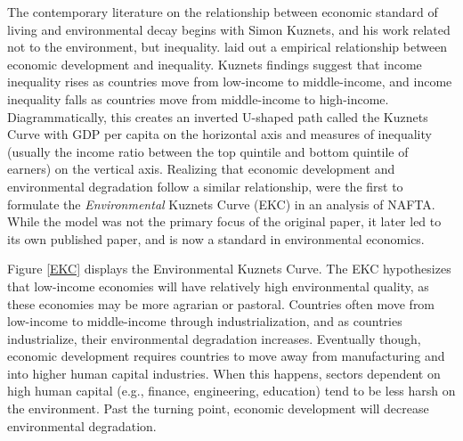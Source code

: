 The contemporary literature on the relationship between economic standard of living and environmental decay begins with Simon Kuznets, and his work related not to the environment, but inequality. \cite{kuznets1955economic} laid out a empirical relationship between economic development and inequality. Kuznets findings suggest that income inequality rises as countries move from low-income to middle-income, and income inequality falls as countries move from middle-income to high-income. Diagrammatically, this creates an inverted U-shaped path called the Kuznets Curve with GDP per capita on the horizontal axis and measures of inequality (usually the income ratio between the top quintile and bottom quintile of earners) on the vertical axis. Realizing that economic development and environmental degradation follow a similar relationship, \cite{NBERw3914} were the first to formulate the \emph{Environmental} Kuznets Curve (EKC) in an analysis of NAFTA. While the model was not the primary focus of the original paper, it later led to its own published paper, \cite{grossman1995economic} and is now a standard in environmental economics. 

Figure \ref{EKC} displays the Environmental Kuznets Curve. The EKC hypothesizes that low-income economies will have relatively high environmental quality, as these economies may be more agrarian or pastoral. Countries often move from low-income to middle-income through industrialization, and as countries industrialize, their environmental degradation increases. Eventually though, economic development requires countries to move away from manufacturing and into higher human capital industries. When this happens, sectors dependent on high human capital (e.g., finance, engineering, education) tend to be less harsh on the environment. Past the turning point, economic development will decrease environmental degradation. 

